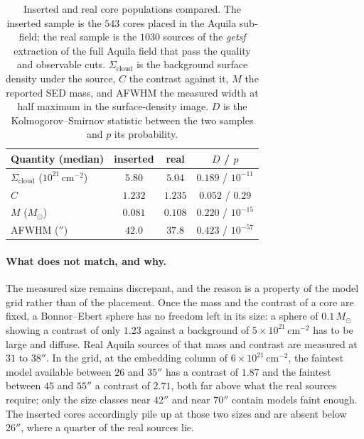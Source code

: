 \documentclass[11pt,a4paper]{article}
\newcommand{\msun}{M_{\odot}}
\newcommand{\Scloud}{\Sigma_{\mathrm{cloud}}}
\begin{document}
\begin{table}
\centering
\caption{Inserted and real core populations compared. The inserted sample is
the $543$ cores placed in the Aquila sub-field; the real sample is the $1030$
sources of the \emph{getsf} extraction of the full Aquila field that pass the
quality and observable cuts. $\Scloud$ is the background surface density under
the source, $C$ the contrast against it, $M$ the reported SED mass, and AFWHM
the measured width at half maximum in the surface-density image. $D$ is the
Kolmogorov--Smirnov statistic between the two samples and $p$ its
probability.}
\label{tab:injmatch}
\begin{tabular}{lccc}
\hline\hline
Quantity (median) & inserted & real & $D$ / $p$ \\
\hline
$\Scloud$ ($10^{21}\,\mathrm{cm^{-2}}$) & $5.80$ & $5.04$ & $0.189$ / $10^{-11}$ \\
$C$                                     & $1.232$ & $1.235$ & $0.052$ / $0.29$ \\
$M$ ($\msun$)                           & $0.081$ & $0.108$ & $0.220$ / $10^{-15}$ \\
AFWHM ($''$)                            & $42.0$ & $37.8$ & $0.423$ / $10^{-57}$ \\
\hline
\end{tabular}
\end{table}

\paragraph{What does not match, and why.}
The measured size remains discrepant, and the reason is a property of the
model grid rather than of the placement. Once the mass and the contrast of a
core are fixed, a Bonnor--Ebert sphere has no freedom left in its size: a
sphere of $0.1\,\msun$ showing a contrast of only $1.23$ against a background
of $5\times10^{21}\,\mathrm{cm^{-2}}$ has to be large and diffuse. Real
Aquila sources of that mass and contrast are measured at $31$ to $38''$. In
the grid, at the embedding column of $6\times10^{21}\,\mathrm{cm^{-2}}$, the
faintest model available between $26$ and $35''$ has a contrast of $1.87$ and
the faintest between $45$ and $55''$ a contrast of $2.71$, both far above what
the real sources require; only the size classes near $42''$ and near $70''$
contain models faint enough. The inserted cores accordingly pile up at those
two sizes and are absent below $26''$, where a quarter of the real sources
lie.
\end{document}
